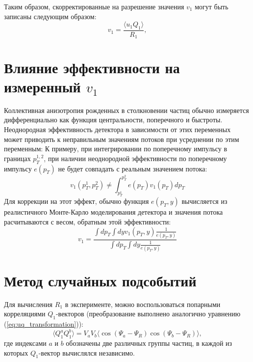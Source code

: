 Таким образом, скорректированные на разрешение значения $v_1$ могут быть записаны следующим образом: 
%
\begin{equation}
    v_1 =  \frac{ \langle u_1 Q_1 \rangle }{R_1},
    \label{eq:v1_formula}
\end{equation}
%

\section{Влияние эффективности на измеренный $v_1$}

Коллективная анизотропия рожденных в столкновении частиц обычно измеряется дифференциально как функция центральности, поперечного и быстроты.
Неоднородная эффективность детектора в зависимости от этих переменных может приводить к неправильным значениям потоков при усреднении по этим переменным:
К примеру, при интегрировании по поперечному импульсу в границах $p_T^{1,2}$, при наличии неоднородной эффективности по поперечному импульсу $e(p_T)$ не будет совпадать с реальным значением потока:
%
\begin{equation}
    v_1( p_T^{1}, p_T^{2} ) \ne \int_{p_T^1}^{p_T^2} e(p_T) v_1(p_T) dp_T 
    \label{eq:v1_formula}
\end{equation}
Для коррекции на этот эффект, обычно функция $e(p_T, y)$ вычисляется из реалистичного Монте-Карло моделирования детектора и значения потока расчитываются с весом, обратным этой эффективности:
%
\begin{equation}
    v_1 = \frac{\int dp_T \int dy v_1(p_T, y) \frac{1}{e(p_T, y)} }{\int dp_T \int dy \frac{1}{e(p_T, y)} } 
    \label{eq:v1_formula}
\end{equation}

\section{Метод случайных подсобытий}

Для вычисления $R_1$ в эксперименте, можно воспользоваться попарными корреляциями $Q_1$-векторов (преобразование выполнено аналогично уравнению (\ref{eq:uq_transformation})): 
%
\begin{equation}
    \langle Q_1^a Q_1^b \rangle = V_a V_b \langle \cos(\Psi_a - \Psi_R) \cos(\Psi_b - \Psi_R) \rangle,
\end{equation}
%
где индексами $a$ и $b$ обозначены две различных группы частиц, в каждой из которых $Q_1$-вектор вычислялся независимо.

